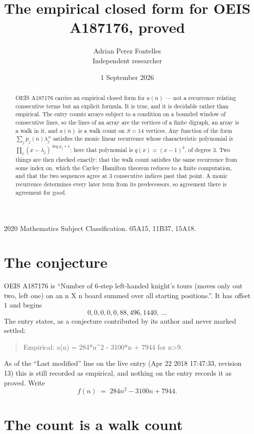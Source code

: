 \documentclass[11pt,a4paper]{article}
\title{The empirical closed form for OEIS A187176, proved}
\author{Adrian Perez Fontelles\\ \small Independent researcher}
\date{1 September 2026}
\theoremstyle{plain}
\theoremstyle{definition}
\begin{document}
\maketitle

\begin{abstract}
OEIS A187176 carries an empirical closed form for $a(n)$ --- not a recurrence relating
consecutive terms but an explicit formula. It is true, and it is decidable rather than
empirical. The entry counts arrays subject to a condition on a bounded window of consecutive lines, so the lines of an array are the
vertices of a finite digraph, an array is a walk in it, and $a(n)$ is a walk count on
$S=14$ vertices. Any function of the form $\sum_j p_j(n)\lambda_j^{\,n}$ satisfies the
monic linear recurrence whose characteristic polynomial is
$\prod_j(x-\lambda_j)^{\deg p_j+1}$; here that polynomial is $q(x)=(x-1)^{3}$, of degree
$3$. Two things are then checked exactly: that the walk count satisfies the same
recurrence from some index on, which the Cayley--Hamilton theorem reduces to a finite
computation, and that the two sequences agree at $3$ consecutive indices past that
point. A monic recurrence determines every later term from its predecessors, so agreement
there is agreement for good.
\end{abstract}

\noindent\small 2020 Mathematics Subject Classification. 05A15, 11B37, 15A18.\normalsize

\section{The conjecture}

OEIS A187176 is ``Number of 6-step left-handed knight's tours (moves only out two, left one) on an n X n board summed over all starting positions.''. It has offset $1$ and begins
\[
0, 0, 0, 0, 0, 88, 496, 1440,\ \dots
\]
The entry states, as a conjecture contributed by its author and never marked settled:
\begin{quote}
Empirical: a(n) = 284*n\^{}2 - 3100*n + 7944 for n>9.
\end{quote}
As of the ``Last modified'' line on the live entry (Apr 22 2018 17:47:33, revision 13) this is still
recorded as empirical, and nothing on the entry records it as proved. Write
\[
f(n)\;=\;284 n^{2} - 3100 n + 7944.
\]

\section{The count is a walk count}
\end{document}
